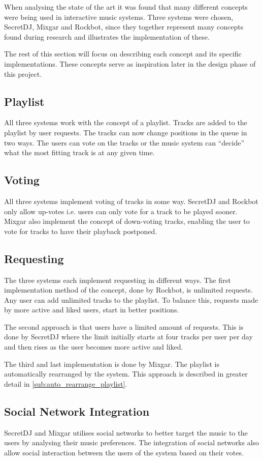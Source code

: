 When analysing the state of the art it was found that many different
concepts were being used in interactive music systems. Three systems
were chosen, SecretDJ, Mixgar and Rockbot, since they together
represent many concepts found during research and illustrates the
implementation of these.

The rest of this section will focus on describing each concept and its
specific implementations. These concepts serve as inspiration later in
the design phase of this project.

\subsection{Playlist}
All three systems work with the concept of a playlist. Tracks are
added to the playlist by user requests. The tracks can now change
positions in the queue in two ways. The users can vote on the tracks
or the music system can \enquote{decide} what the most fitting track
is at any given time.

\subsection{Voting}
All three systems implement voting of tracks in some way. SecretDJ and
Rockbot only allow up-votes i.e. users can only vote for a track to be
played sooner. Mixgar also implement the concept of down-voting
tracks, enabling the user to vote for tracks to have their playback
postponed.

\subsection{Requesting}
The three systems each implement requesting in different ways. The
first implementation method of the concept, done by Rockbot, is
unlimited requests.  Any user can add unlimited tracks to the
playlist. To balance this, requests made by more active and liked
users, start in better positions.

The second approach is that users have a limited amount of
requests. This is done by SecretDJ where the limit initially starts at
four tracks per user per day and then rises as the user becomes more
active and liked.

The third and last implementation is done by Mixgar. The playlist is
automatically rearranged by the system. This approach is described in
greater detail in \cref{sub:auto_rearrange_playlist}.

\subsection{Social Network Integration}
SecretDJ and Mixgar utilises social networks to better target the
music to the users by analysing their music preferences. The
integration of social networks also allow social interaction between
the users of the system based on their votes.

